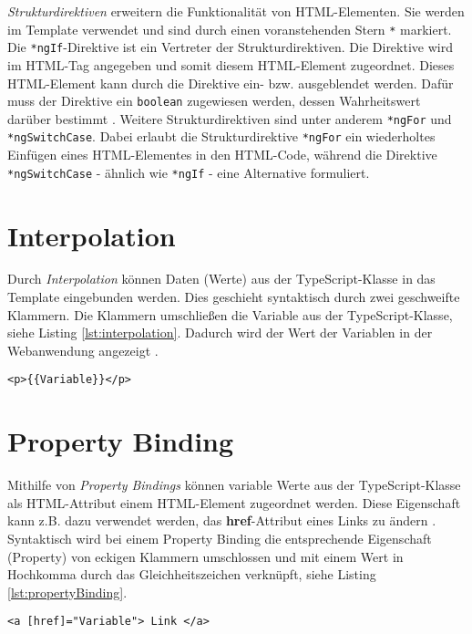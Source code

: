 \textit{Strukturdirektiven} erweitern die Funktionalität von HTML-Elementen. Sie werden im Template verwendet und sind durch einen voranstehenden Stern \texttt{*} markiert. Die \texttt{*ngIf}-Direktive ist ein Vertreter der Strukturdirektiven. Die Direktive wird im HTML-Tag angegeben und somit diesem HTML-Element zugeordnet. 
Dieses HTML-Element kann durch die Direktive ein- bzw. ausgeblendet werden. Dafür muss der Direktive ein \texttt{boolean} zugewiesen werden, dessen Wahrheitswert darüber bestimmt \cite{Book2020}\cite{NgIf2021}.
Weitere Strukturdirektiven sind unter anderem \texttt{*ngFor} und \texttt{*ngSwitchCase}. Dabei erlaubt die Strukturdirektive \texttt{*ngFor} ein wiederholtes Einfügen eines HTML-Elementes in den HTML-Code, während die Direktive \texttt{*ngSwitchCase} - ähnlich wie \texttt{*ngIf} - eine Alternative formuliert. 

\section{Interpolation}

Durch \textit{Interpolation} können Daten (Werte) aus der TypeScript-Klasse in das Template eingebunden werden. Dies geschieht syntaktisch durch zwei geschweifte Klammern. Die Klammern umschließen die Variable aus der TypeScript-Klasse, siehe Listing \ref{lst:interpolation}. Dadurch wird der Wert der Variablen in der Webanwendung angezeigt \cite{Book2020}\cite{interpolation2021}. 
\begin{lstlisting}[caption=Interpolation im Template, label=lst:interpolation]
    <p>{{Variable}}</p>
\end{lstlisting}

\section{Property Binding}\label{subsec:propertyBinding}
Mithilfe von \textit{Property Bindings} können variable Werte aus der TypeScript-Klasse als HTML-Attribut einem HTML-Element zugeordnet werden. Diese Eigenschaft kann z.B. dazu verwendet werden, das \textbf{href}-Attribut eines Links zu ändern \cite{Book2020}\cite{propertyBinding2021}. 
Syntaktisch wird bei einem Property Binding die entsprechende Eigenschaft (Property) von eckigen Klammern umschlossen und mit einem Wert in Hochkomma durch das Gleichheitszeichen verknüpft, siehe Listing \ref{lst:propertyBinding}.
\begin{lstlisting}[caption=Property Binding, label=lst:propertyBinding]
    <a [href]="Variable"> Link </a>
\end{lstlisting}
